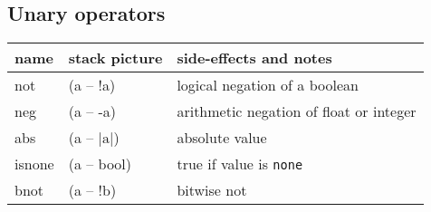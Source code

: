 \subsection{Unary operators}
\begin{center}
\begin{tabular}{|l|l|p{4in}|}\hline
\textbf{name} & \textbf{stack picture} & \textbf{side-effects and notes}\\ \hline
not & (a -- !a) & logical negation of a boolean\\
neg & (a -- -a) & arithmetic negation of float or integer\\
abs & (a -- $|\textrm{a}|$) & absolute value\\
isnone & (a -- bool) & true if value is \texttt{none} \\
bnot & (a -- !b) & bitwise not\\    
\hline
\end{tabular}
\end{center}
